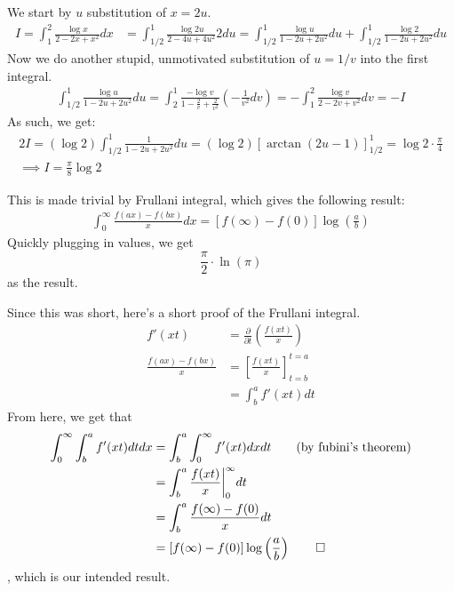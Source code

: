 \documentclass{report}
\begin{document}
\sol We start by $u$ substitution of $x = 2u$. 
\begin{align*}
    I  = \int_1^2 \frac{\log x}{2-2x+x^2}dx &= \int_{1/2}^1 \frac{\log 2u}{2-4u+4u^2}2du = \int_{1/2}^1 \frac{\log u}{1 - 2u + 2u^2}du + \int_{1/2}^1 \frac{\log 2}{1 - 2u + 2u^2}du
\end{align*}
Now we do another stupid, unmotivated substitution of $u = 1/v$ into the first integral.
\begin{align*}
    \int_{1/2}^1 \frac{\log u}{1 - 2u + 2u^2}du = \int_2^1 \frac{-\log v}{1 - \frac{2}{v} + \frac{2}{v^2}}\left(-\frac{1}{v^2}dv\right)= - \int_1^2 \frac{\log v}{2 - 2v + v^2}dv = -I
\end{align*}
As such, we get:
\begin{align*}
    2I = (\log 2)\int_{1/2}^1 \frac{1}{1 - 2u + 2u^2}du = (\log 2)\left[\arctan(2u - 1)\right]^1_{1/2} = \log 2 \cdot \frac{\pi}{4}\\
    \implies I = \frac{\pi}{8}\log 2
\end{align*}

\sol This is made trivial by Frullani integral, which gives the following result:
\begin{align*}
    \int_0^{\infty}\frac{f(ax) - f(bx)}{x}dx = [f(\infty) - f(0)]\log\left(\frac{a}{b}\right)
\end{align*}
Quickly plugging in values, we get $$\frac{\pi}{2} \cdot \ln(\pi)$$ as the result.

Since this was short, here's a short proof of the Frullani integral.
\begin{align*}
    f'(xt) &= \frac{\partial}{\partial t} \left(\frac{f(xt)}{x}\right)\\
    \frac{f(ax) - f(bx)}{x} &= \left[\frac{f(xt)}{x}\right]^{t=a}_{t=b} \\
    &= \int_b^a f'(xt)dt
\end{align*}
From here, we get that
\begin{align*}
    \int_0^{\infty} \int_b^a f'(xt)dtdx &= \int_b^a \int_0^{\infty} f'(xt) dxdt \tag{by fubini's theorem} \\
    &= \int_b^a \frac{f(xt)}{x} \bigg|_0^{\infty} dt \\
    &= \int_b^a \frac{f(\infty) - f(0)}{x} dt \\
    &= [f(\infty) - f(0)]\log\left(\frac{a}{b}\right) \qed 
\end{align*}
, which is our intended result.
\end{document}
